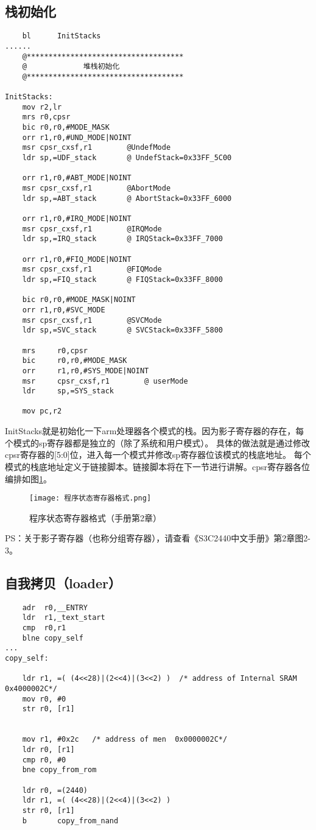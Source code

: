 \subsection{栈初始化}
\begin{lstlisting}
	bl      InitStacks
......
	@************************************
	@             堆栈初始化
	@************************************

InitStacks:
	mov r2,lr
	mrs	r0,cpsr
	bic	r0,r0,#MODE_MASK
	orr	r1,r0,#UND_MODE|NOINT
	msr	cpsr_cxsf,r1		@UndefMode
	ldr	sp,=UDF_stack		@ UndefStack=0x33FF_5C00

	orr	r1,r0,#ABT_MODE|NOINT
	msr	cpsr_cxsf,r1		@AbortMode
	ldr	sp,=ABT_stack		@ AbortStack=0x33FF_6000

	orr	r1,r0,#IRQ_MODE|NOINT
	msr	cpsr_cxsf,r1		@IRQMode
	ldr	sp,=IRQ_stack		@ IRQStack=0x33FF_7000

	orr	r1,r0,#FIQ_MODE|NOINT
	msr	cpsr_cxsf,r1		@FIQMode
	ldr	sp,=FIQ_stack		@ FIQStack=0x33FF_8000

	bic	r0,r0,#MODE_MASK|NOINT
	orr	r1,r0,#SVC_MODE
	msr	cpsr_cxsf,r1		@SVCMode
	ldr	sp,=SVC_stack		@ SVCStack=0x33FF_5800

	mrs     r0,cpsr
	bic     r0,r0,#MODE_MASK
	orr     r1,r0,#SYS_MODE|NOINT
	msr     cpsr_cxsf,r1    	@ userMode
	ldr     sp,=SYS_stack

	mov	pc,r2
\end{lstlisting}

InitStacks就是初始化一下arm处理器各个模式的栈。因为影子寄存器的存在，每个模式的sp寄存器都是独立的（除了系统和用户模式）。
具体的做法就是通过修改cpsr寄存器的[5:0]位，进入每一个模式并修改sp寄存器位该模式的栈底地址。
每个模式的栈底地址定义于链接脚本。链接脚本将在下一节进行讲解。cpsr寄存器各位编排如图\ref{程序状态寄存器格式}。
\begin{figure}[H]
	\texttt{[image: 程序状态寄存器格式.png]}
	\caption{程序状态寄存器格式（手册第2章）}
	\label{程序状态寄存器格式}
\end{figure}

PS：关于影子寄存器（也称分组寄存器），请查看《S3C2440中文手册》第2章图2-3。


\subsection{自我拷贝（loader）}
\begin{lstlisting}
	adr  r0,__ENTRY
	ldr  r1,_text_start
	cmp  r0,r1
	blne copy_self  
...
copy_self:

	ldr	r1, =( (4<<28)|(2<<4)|(3<<2) )	/* address of Internal SRAM  0x4000002C*/
	mov	r0, #0		
	str	r0, [r1]


	mov	r1, #0x2c	/* address of men  0x0000002C*/
	ldr	r0, [r1]
	cmp	r0, #0
	bne	copy_from_rom
        
    ldr	r0, =(2440)
	ldr	r1, =( (4<<28)|(2<<4)|(3<<2) )
	str	r0, [r1]
	b       copy_from_nand 
\end{lstlisting}

